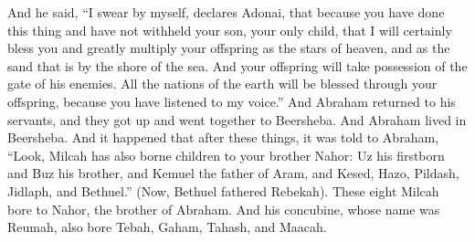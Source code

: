 \begin{biblechapter}
\verse And he said, “I swear by myself, declares Adonai, that because you have done this thing and have not withheld your son, your only child,
\verse that I will certainly bless you and greatly multiply your offspring as the stars of heaven, and as the sand that is by the shore of the sea. And your offspring will take possession of the gate of his enemies.
\verse All the nations of the earth will be blessed through your offspring, because you have listened to my voice.”
\verse And Abraham returned to his servants, and they got up and went together to Beersheba. And Abraham lived in Beersheba.
\verse And it happened that after these things, it was told to Abraham, “Look, Milcah has also borne children to your brother Nahor:
\verse Uz his firstborn and Buz his brother, and Kemuel the father of Aram,
\verse and Kesed, Hazo, Pildash, Jidlaph, and Bethuel.”
\verse (Now, Bethuel fathered Rebekah). These eight Milcah bore to Nahor, the brother of Abraham.
\verse And his concubine, whose name was Reumah, also bore Tebah, Gaham, Tahash, and Maacah.
\end{biblechapter}

